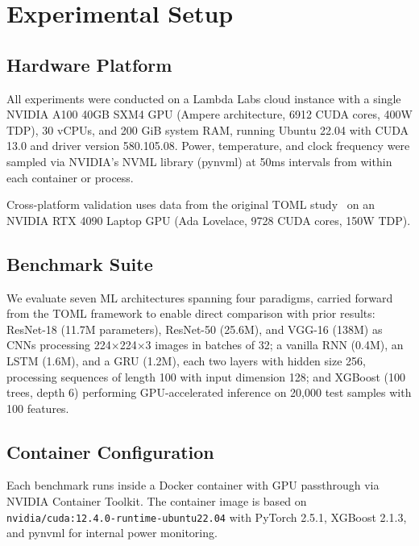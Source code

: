 \documentclass[conference]{IEEEtran}
\begin{document}
\section{Experimental Setup}
\label{sec:setup}

\subsection{Hardware Platform}

All experiments were conducted on a Lambda Labs cloud instance with a single NVIDIA A100 40GB SXM4 GPU (Ampere architecture, 6912 CUDA cores, 400W TDP), 30 vCPUs, and 200 GiB system RAM, running Ubuntu 22.04 with CUDA 13.0 and driver version 580.105.08. Power, temperature, and clock frequency were sampled via NVIDIA's NVML library (pynvml) at 50ms intervals from within each container or process.

Cross-platform validation uses data from the original TOML study~\cite{syed2026toml} on an NVIDIA RTX 4090 Laptop GPU (Ada Lovelace, 9728 CUDA cores, 150W TDP).

\subsection{Benchmark Suite}

We evaluate seven ML architectures spanning four paradigms, carried forward from the TOML framework to enable direct comparison with prior results: ResNet-18 (11.7M parameters), ResNet-50 (25.6M), and VGG-16 (138M) as CNNs processing 224$\times$224$\times$3 images in batches of 32; a vanilla RNN (0.4M), an LSTM (1.6M), and a GRU (1.2M), each two layers with hidden size 256, processing sequences of length 100 with input dimension 128; and XGBoost (100 trees, depth 6) performing GPU-accelerated inference on 20,000 test samples with 100 features.

\subsection{Container Configuration}

Each benchmark runs inside a Docker container with GPU passthrough via NVIDIA Container Toolkit. The container image is based on \texttt{nvidia/cuda:12.4.0-runtime-ubuntu22.04} with PyTorch 2.5.1, XGBoost 2.1.3, and pynvml for internal power monitoring.
\end{document}
